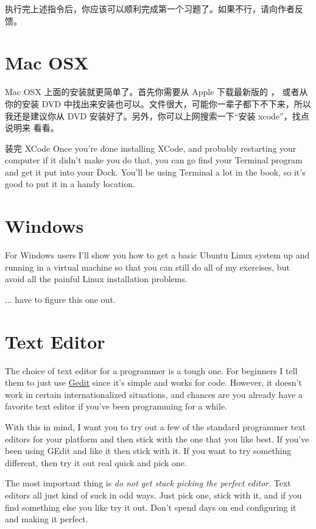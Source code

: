执行完上述指令后，你应该可以顺利完成第一个习题了。如果不行，请向作者反馈。


\section{Mac OSX}

Mac OSX 上面的安装就更简单了。首先你需要从 Apple 下载最新版的 ，
或者从你的安装 DVD 中找出来安装也可以。文件很大，可能你一辈子都下不下来，所以
我还是建议你从 DVD 安装好了。另外，你可以上网搜索一下“安装 xcode”，找点说明来
看看。

装完 XCode 
Once you're done installing XCode, and probably restarting your computer
if it didn't make you do that, you can go find your Terminal program
and get it put into your Dock.  You'll be using Terminal a lot in
the book, so it's good to put it in a handy location.


\section{Windows}

For Windows users I'll show you how to get a basic Ubuntu Linux system up and
running in a virtual machine so that you can still do all of my exercises, but
avoid all the painful Linux installation problems.

... have to figure this one out.


\section{Text Editor}

The choice of text editor for a programmer is a tough one.  For beginners
I tell them to just use \href{http://projects.gnome.org/gedit/}{Gedit} since
it's simple and works for code.  However, it doesn't work in certain
internationalized situations, and chances are you already have a favorite
text editor if you've been programming for a while.

With this in mind, I want you to try out a few of the standard programmer
text editors for your platform and then stick with the one that you like
best.  If you've been using GEdit and like it then stick with it.  If you
want to try something different, then try it out real quick and pick one.

The most important thing is \emph{do not get stuck picking the perfect editor}.
Text editors all just kind of suck in odd ways.  Just pick one, stick with it,
and if you find something else you like try it out.  Don't spend days
on end configuring it and making it perfect.

